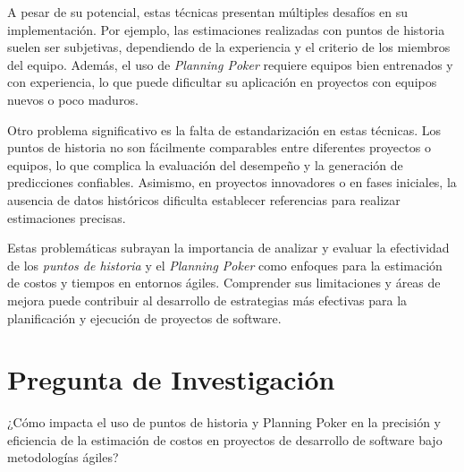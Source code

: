 A pesar de su potencial, estas técnicas presentan múltiples desafíos en su implementación. Por ejemplo, las estimaciones realizadas con puntos de historia suelen ser subjetivas, dependiendo de la experiencia y el criterio de los miembros del equipo. Además, el uso de \textit{Planning Poker} requiere equipos bien entrenados y con experiencia, lo que puede dificultar su aplicación en proyectos con equipos nuevos o poco maduros.

Otro problema significativo es la falta de estandarización en estas técnicas. Los puntos de historia no son fácilmente comparables entre diferentes proyectos o equipos, lo que complica la evaluación del desempeño y la generación de predicciones confiables. Asimismo, en proyectos innovadores o en fases iniciales, la ausencia de datos históricos dificulta establecer referencias para realizar estimaciones precisas.

Estas problemáticas subrayan la importancia de analizar y evaluar la efectividad de los \textit{puntos de historia} y el \textit{Planning Poker} como enfoques para la estimación de costos y tiempos en entornos ágiles. Comprender sus limitaciones y áreas de mejora puede contribuir al desarrollo de estrategias más efectivas para la planificación y ejecución de proyectos de software.

\section{Pregunta de Investigación}
¿Cómo impacta el uso de puntos de historia y Planning Poker en la precisión y eficiencia de la estimación de costos en proyectos de desarrollo de software bajo metodologías ágiles?